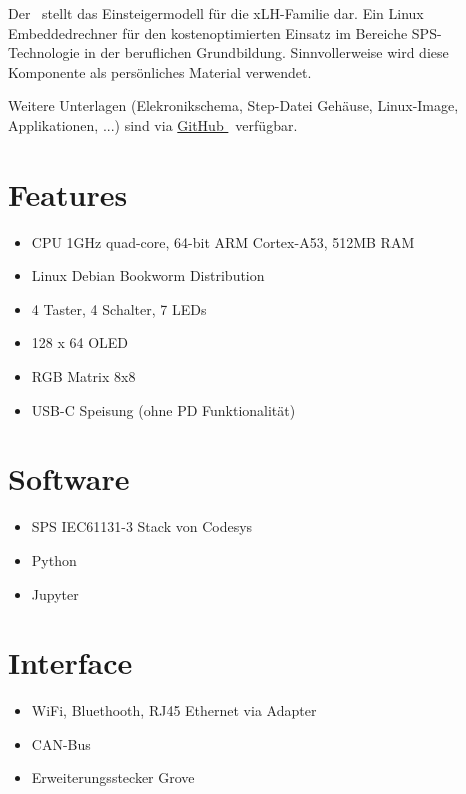 

Der \textbf{\lernplattformname}\ stellt das Einsteigermodell für die xLH-Familie dar.
Ein Linux Embeddedrechner für den kostenoptimierten Einsatz im Bereiche SPS-Technologie in der beruflichen Grundbildung.
Sinnvollerweise wird diese Komponente als persönliches Material verwendet.

Weitere Unterlagen (Elekronikschema, Step-Datei Gehäuse, Linux-Image, Applikationen, ...) sind via
\href{https://github.com/xemax-ag/xLH/}{GitHub \lernplattformname}\ verfügbar.

\section{Features}

\begin{itemize}
    \item CPU 1GHz quad-core, 64-bit ARM Cortex-A53, 512MB RAM
    \item Linux Debian Bookworm Distribution
    \item 4 Taster, 4 Schalter, 7 LEDs
    \item 128 x 64 OLED
    \item RGB Matrix 8x8
    \item USB-C Speisung (ohne PD Funktionalität)
\end{itemize}

\section{Software}

\begin{itemize}
    \item SPS IEC61131-3 Stack von Codesys
    \item Python
    \item Jupyter
\end{itemize}

\section{Interface}

\begin{itemize}
    \item WiFi, Bluethooth, RJ45 Ethernet via Adapter
    \item CAN-Bus
    \item Erweiterungsstecker Grove
\end{itemize}

